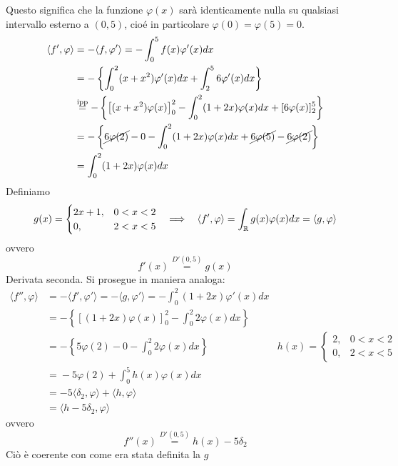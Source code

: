 Questo significa che la funzione $\varphi (x)$ sarà identicamente nulla su qualsiasi intervallo esterno a $(0, 5)$, cioé in particolare $\varphi (0) = \varphi (5) = 0$.
\begin{align*}
\langle f', \varphi \rangle  & = - \langle f, \varphi '\rangle = - \int^{5}_{0} f(x)\varphi '(x)dx\\
 & = - \left\{\int^{2}_{0} (x + x^{2})\varphi '(x)dx + \int^{5}_{2} 6\varphi '(x)dx\right\}\\
 & \overset{\text{ipp}}{=} - \left\{\left[ (x + x^{2})\varphi (x)\right]^{2}_{0} - \int^{2}_{0} (1 + 2x)\varphi (x)dx + [ 6\varphi (x)]^{5}_{2}\right\}\\
 & = - \left\{\cancel{6\varphi (2)} - 0 - \int^{2}_{0}(1 + 2x) \varphi (x) dx + \cancel{6\varphi (5)} - \cancel{6\varphi (2)}\right\}\\
 & = \int^{2}_{0}(1 + 2x) \varphi (x) dx
\end{align*}
Definiamo
\begin{equation*}
g(x) = 
\begin{cases}
2x + 1, & 0 < x < 2\\
0, & 2 < x < 5
\end{cases} \ \ \implies \ \ \langle f', \varphi \rangle = \int_{\mathbb{R}} g(x) \varphi (x) dx = \langle g, \varphi \rangle 
\end{equation*}
ovvero
\begin{equation*}
f'(x)\overset{D'(0, 5)}{=} g(x)
\end{equation*}
Derivata seconda. Si prosegue in maniera analoga:
\begin{equation*}
\begin{aligned}
\langle f'', \varphi \rangle  & = - \langle f', \varphi '\rangle = - \langle g, \varphi '\rangle = - \int^{2}_{0} (1 + 2x)\varphi '(x)dx & \\
 & = - \left\{[ (1 + 2x)\varphi (x)]^{2}_{0} - \int^{2}_{0} 2\varphi (x)dx\right\} & \\
 & = - \left\{5\varphi (2) - 0 - \int^{2}_{0} 2\varphi (x)dx\right\} & h(x) = 
 \begin{cases}
2, & 0 < x < 2\\
0, & 2 < x < 5
\end{cases}\\
 & \overset{}{=} - 5\varphi (2) + \int^{5}_{0} h(x)\varphi (x)dx & \\
 & = - 5\langle \delta_{2}, \varphi \rangle + \langle h, \varphi \rangle  & \\
 & = \langle h - 5\delta_{2}, \varphi \rangle  & 
\end{aligned}
\end{equation*}
ovvero
\begin{equation*}
f''(x)\overset{D'(0, 5)}{=} h(x) - 5\delta_{2}
\end{equation*}
Ciò è coerente con come era stata definita la $g$


